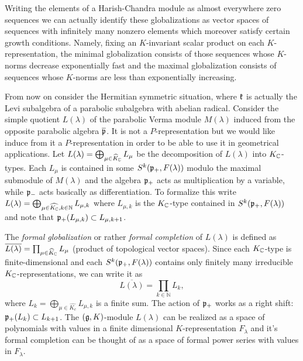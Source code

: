 Writing the elements of a Harish-Chandra module as almost everywhere zero sequences we can actually identify these globalizations as vector spaces of sequences with infinitely many nonzero elements which moreover satisfy certain growth conditions. Namely, fixing an $K$-invariant scalar product on each $K$-representation, the minimal globalization consists of those sequences whose $K$-norms decrease exponentially fast and the maximal globalization consists of sequences whose $K$-norms are less than exponentially increasing. 


From now on consider the Hermitian symmetric situation, where $\mathfrak{k}$ is actually the Levi subalgebra of a parabolic subalgebra with abelian radical. Consider the simple quotient $L(\lambda)$ of the parabolic Verma module $M(\lambda)$ induced from the opposite parabolic algebra $\overline{\mathfrak{p}}$. It is not a $P$-representation but we would like induce from it a $P$-representation in order to be able to use it in geometrical applications. Let $L(\lambda)=\bigoplus_{\mu\in \widehat{K}_{\mathbb{C}}} L_\mu$ be the decomposition of $L(\lambda)$ into $K_{\mathbb{C}}$-types. Each $L_\mu$ is contained in some $S^k(\mathfrak{p}_+,F(\lambda))$ modulo the maximal submodule of $M(\lambda)$ and the algebra $\mathfrak{p}_+$ acts  as multiplication by a variable, while $\mathfrak{p}_-$ acts basically as differentiation. To formalize this write $L(\lambda) = \bigoplus_{\mu\in\widehat{K_{\mathbb{C}}}, k\in\mathbb{N}} L_{\mu,k}$ where $L_{\mu,k}$ is the $K_{\mathbb{C}}$-type contained in $S^k(\mathfrak{p}_+,F(\lambda))$ and note that $\mathfrak{p}_+ (L_{\mu,k}) \subset L_{\mu,k+1}$.


The \emph{formal globalization} or rather \emph{formal completion} of $L(\lambda)$ is defined as   $\overline{L(\lambda)}=\prod_{\mu\in \widehat{K}_{\mathbb{C}}} L_\mu$ (product of topological vector spaces).  Since each $K_{\mathbb{C}}$-type is finite-dimensional and each $S^k(\mathfrak{p}_+,F(\lambda))$ contains only finitely many irreducible $K_{\mathbb{C}}$-representations, we can write it as
\[\overline{L(\lambda)} = \prod_{k\in\mathbb{N}} L_k,\] %
where $L_k = \bigoplus_{\mu\in\widehat{K_c}} L_{\mu,k}$ is a finite sum. The action of $\mathfrak{p}_+$ works as a right shift: $\mathfrak{p}_+(L_k)\subset L_{k+1}$. The $(\mathfrak{g},K)$-module $L(\lambda)$ can be realized as a space of polynomials with values in a finite dimensional $K$-representation $F_\lambda$ and it's formal completion can be thought of as a space of formal power series with values in $F_\lambda$. %


